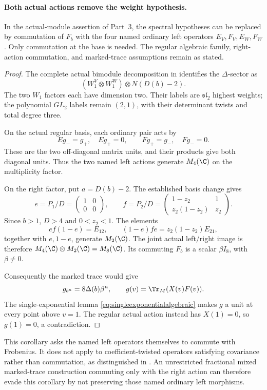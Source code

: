 \paragraph{Both actual actions remove the weight hypothesis.}
In the actual-module assertion of Part~3, the spectral
hypotheses can be replaced by commutation of $F_b$
with the four named ordinary left operators
$E_V,F_V,E_W,F_W$.
Only commutation at the base is needed.
The regular algebraic family, right-action commutation,
and marked-trace assumptions remain as stated.

\begin{proof}
The complete actual bimodule decomposition in 
identifies the $\Delta$-sector as
\[
 (W_1^V\otimes W_1^W)\otimes N(D(b)-2).
\]
The two $W_1$ factors each have dimension two.
Their labels are $\mathfrak{sl}_2$ highest weights;
the polynomial $GL_2$ labels remain $(2,1)$, with
their determinant twists and total degree three.

On the actual regular basis, each ordinary pair acts by
\[
 Eg_-=g_+,\quad Eg_+=0,\qquad
 Fg_+=g_-,\quad Fg_-=0.
\]
These are the two off-diagonal matrix units, and their
products give both diagonal units.
Thus the two named left actions generate $M_4(\C)$
on the multiplicity factor.

On the right factor, put $a=D(b)-2$.
The established basis change gives
\[
 e=P_1/D=\begin{pmatrix}1&0\\0&0\end{pmatrix},\qquad
 f=P_2/D=
 \begin{pmatrix}1-z_2&1\\z_2(1-z_2)&z_2\end{pmatrix}.
\]
Since $b>1$, $D>4$ and $0<z_2<1$.
The elements
\[
 ef(1-e)=E_{12},\qquad
 (1-e)fe=z_2(1-z_2)E_{21},
\]
together with $e,1-e$, generate $M_2(\C)$.
The joint actual left/right image is therefore
$M_4(\C)\otimes M_2(\C)=M_8(\C)$.
Its commuting $F_b$ is a scalar $\beta I_8$, with
$\beta\ne0$.

Consequently the marked trace would give
\[
 g_{b^n}=8\Delta(b)\beta^n,\qquad
 g(v)=\Tr_M(X(v)F(v)).
\]
The single-exponential lemma
\eqref{eq:singleexponentialalgebraic}
makes $g$ a unit at every point above $v=1$.
The regular actual action instead has $X(1)=0$,
so $g(1)=0$, a contradiction.
\end{proof}

This corollary asks the named left operators themselves
to commute with Frobenius.
It does not apply to coefficient-twisted operators
satisfying covariance rather than commutation, as
distinguished in .
An unrestricted fractional mixed marked-trace construction
commuting only with the right action can therefore evade
this corollary by not preserving those named ordinary
left morphisms.

